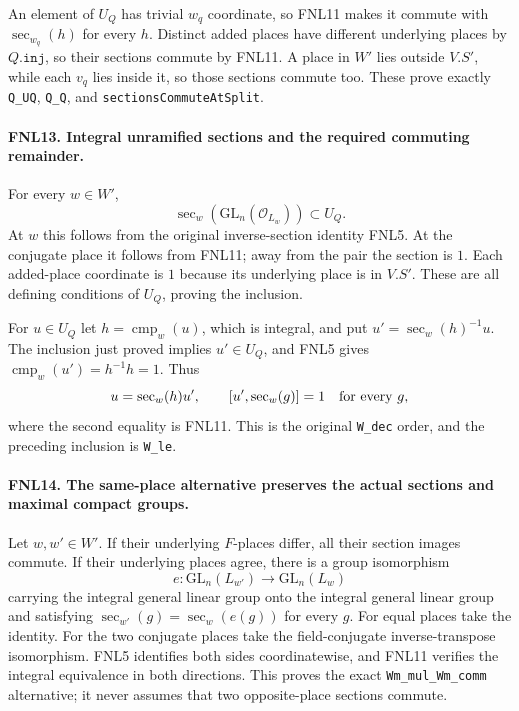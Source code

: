 An element of \(U_Q\) has trivial \(w_q\) coordinate, so FNL11
makes it commute with \(\operatorname{sec}_{w_q}(h)\) for every
\(h\).  Distinct added places have different underlying places by
\(Q.\texttt{inj}\), so their sections commute by FNL11.  A place
in \(W'\) lies outside \(V.S'\), while each \(v_q\) lies inside
it, so those sections commute too.  These prove exactly
\texttt{Q\_UQ}, \texttt{Q\_Q}, and
\texttt{sectionsCommuteAtSplit}.

\paragraph{FNL13. Integral unramified sections and the required commuting remainder.}
\label{claim:FNL13}
For every \(w\in W'\),
\[
 \operatorname{sec}_w(\mathrm{GL}_n(\mathcal O_{L_w}))\subset U_Q.
\]
At \(w\) this follows from the original inverse-section identity
FNL5.  At the conjugate place it follows from FNL11; away from the
pair the section is \(1\).  Each added-place coordinate is \(1\)
because its underlying place is in \(V.S'\).  These are all defining
conditions of \(U_Q\), proving the inclusion.

For \(u\in U_Q\) let \(h=\operatorname{cmp}_w(u)\), which is
integral, and put \(u'=\operatorname{sec}_w(h)^{-1}u\).
The inclusion just proved implies \(u'\in U_Q\), and FNL5 gives
\(\operatorname{cmp}_w(u')=h^{-1}h=1\).
Thus
\[
 u=\operatorname{sec}_w(h)u',\qquad
 [u',\operatorname{sec}_w(g)]=1\quad\hbox{for every }g,
\]
where the second equality is FNL11.  This is the original
\texttt{W\_dec} order, and the preceding inclusion is
\texttt{W\_le}.

\paragraph{FNL14. The same-place alternative preserves the actual sections and maximal compact groups.}
\label{claim:FNL14}
Let \(w,w'\in W'\).  If their underlying \(F\)-places differ,
all their section images commute.  If their underlying places agree,
there is a group isomorphism
\[
 e:\mathrm{GL}_n(L_{w'})\longrightarrow\mathrm{GL}_n(L_w)
\]
carrying the integral general linear group onto the integral general
linear group and satisfying
\(\operatorname{sec}_{w'}(g)=\operatorname{sec}_w(e(g))\) for every
\(g\).  For equal places take the identity.  For the two conjugate
places take the field-conjugate inverse-transpose isomorphism.
FNL5 identifies both sides coordinatewise, and FNL11 verifies the
integral equivalence in both directions.  This proves the exact
\texttt{Wm\_mul\_Wm\_comm} alternative; it never assumes that two
opposite-place sections commute.

